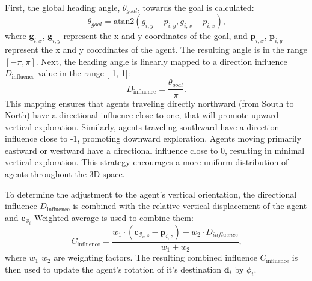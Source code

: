         First, the global heading angle, $\theta_{goal}$, towards the goal is calculated: 
        \begin{equation}
            \theta_{goal} = \text{atan2}(g_{i,y} - p_{i,y}, g_{i,x} - p_{i,x})\text{,}
        \end{equation}
        where $\mathbf{g}_{i, x}$, $\mathbf{g}_{i, y}$ represent the x and y coordinates of the goal, and $\mathbf{p}_{i, x}$, $\mathbf{p}_{i, y}$ represent the x and y coordinates of the agent.
        The resulting angle is in the range $[-\pi, \pi]$.
        Next, the heading angle is linearly mapped to a direction influence $D_{\text{influence}}$ value in the range [-1, 1]:
        \begin{equation}
            D_{\text{influence}} = \frac{\theta_{goal}}{\pi}\text{.}
        \end{equation}
        This mapping ensures that agents traveling directly northward (from South to North) have a directional influence close to one, that will promote upward vertical exploration. 
        Similarly, agents traveling southward have a direction influence close to -1, promoting downward exploration. 
        Agents moving primarily eastward or westward have a directional influence close to 0, resulting in minimal vertical exploration.
        This strategy encourages a more uniform distribution of agents throughout the \ac{3D} space. 

        To determine the adjustment to the agent's vertical orientation, the directional influence $D_{\text{influence}}$ is combined with the relative vertical displacement of the agent and $\mathbf{c}_{\mathcal{S}_i}$
        Weighted average is used to combine them: 
        \begin{equation}
            \label{eqn:combined_influace}
            C_{\text{influence}} = \frac{w_1 \cdot (\mathbf{c}_{\mathcal{S}_i,z} - \mathbf{p}_{i,z}) + w_2 \cdot D_{influence}}{w_1 + w_2}\text{,}
        \end{equation} 
        where $w_1$ $w_2$ are weighting factors. The resulting combined influence $C_{\text{influence}}$ is then used to update the agent's rotation of it's destination $\mathbf{d}_i$ by $\phi_i$.

